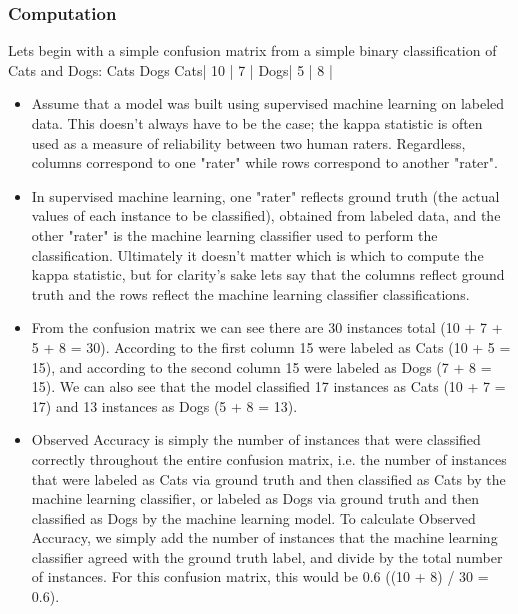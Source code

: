 \documentclass[caret-main.tex]{subfiles}
\begin{document}
\subsubsection{Computation}
Lets begin with a simple confusion matrix from a simple binary classification of Cats and Dogs:
     Cats Dogs
Cats| 10 | 7  |
Dogs| 5  | 8  |
\begin{itemize}
\item Assume that a model was built using supervised machine learning on labeled data. This doesn't always have to be the case; the kappa statistic is often used as a measure of reliability between two human raters. Regardless, columns correspond to one "rater" while rows correspond to another "rater". 

\item In supervised machine learning, one "rater" reflects ground truth (the actual values of each instance to be classified), obtained from labeled data, and the other "rater" is the machine learning classifier used to perform the classification. Ultimately it doesn't matter which is which to compute the kappa statistic, but for clarity's sake lets say that the columns reflect ground truth and the rows reflect the machine learning classifier classifications.

\item From the confusion matrix we can see there are 30 instances total (10 + 7 + 5 + 8 = 30). According to the first column 15 were labeled as Cats (10 + 5 = 15), and according to the second column 15 were labeled as Dogs (7 + 8 = 15). We can also see that the model classified 17 instances as Cats (10 + 7 = 17) and 13 instances as Dogs (5 + 8 = 13).

\item Observed Accuracy is simply the number of instances that were classified correctly throughout the entire confusion matrix, i.e. the number of instances that were labeled as Cats via ground truth and then classified as Cats by the machine learning classifier, or labeled as Dogs via ground truth and then classified as Dogs by the machine learning model. To calculate Observed Accuracy, we simply add the number of instances that the machine learning classifier agreed with the ground truth label, and divide by the total number of instances. For this confusion matrix, this would be 0.6 ((10 + 8) / 30 = 0.6).


\end{itemize}
\end{document}
